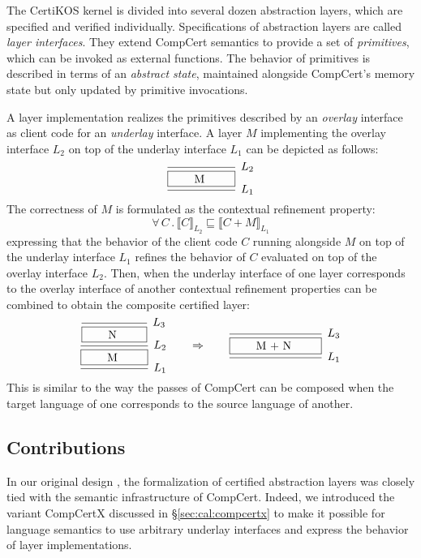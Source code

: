 \documentclass[11pt,oneside]{book}
\theoremstyle{definition}
\newcommand{\refby}{\sqsubseteq} %
\begin{document}
The CertiKOS kernel is divided into several dozen abstraction layers,
which are specified and verified individually.
Specifications of abstraction layers
are called \emph{layer interfaces}.
They extend CompCert semantics
to provide a set of \emph{primitives},
which can be invoked as
external functions.
The behavior of primitives is described in terms of
an \emph{abstract state},
maintained alongside CompCert's memory state
but only updated by primitive invocations.

A layer implementation
realizes the primitives described by an \emph{overlay} interface
as client code for an \emph{underlay} interface.
A layer $M$ implementing the overlay interface $L_2$
on top of the underlay interface $L_1$ can be depicted as follows:
\[
  \begin{prooftree}
    \infer0[$L_2$]{\fbox{\qquad M \qquad}}
    \infer1[$L_1$]{}
  \end{prooftree}
\]
The correctness of $M$ is formulated as
the contextual refinement property:
\[
  \forall \, C \, . \,
  \llbracket C \rrbracket_{L_2} \refby
  \llbracket C + M \rrbracket_{L_1}
\]
expressing that the behavior of the client code $C$
running alongside $M$ on top of the underlay interface $L_1$
refines the behavior of $C$
evaluated on top of the overlay interface $L_2$.
Then,
when the underlay interface of one layer
corresponds to the overlay interface of another
contextual refinement properties can be combined
to obtain the composite certified layer:
\[
  \begin{prooftree}
    \infer0[$L_3$]{\fbox{\qquad N \qquad}}
    \infer1[$L_2$]{\fbox{\qquad M \qquad}}
    \infer1[$L_1$]{}
  \end{prooftree}
  \qquad
  \Rightarrow
  \qquad
  \begin{prooftree}
    \infer0[$L_3$]{\fbox{\qquad M + N \qquad}}
    \infer1[$L_1$]{}
  \end{prooftree}
\]
This is similar to the way the passes of CompCert
can be composed when the target language of one corresponds to
the source language of another.


\subsection{Contributions} %

In our original design \citep{popl15},
the formalization of certified abstraction layers
was closely tied with
the semantic infrastructure of CompCert.
Indeed,
we introduced the variant CompCertX discussed in \S\ref{sec:cal:compcertx}
to make it possible for language semantics
to use arbitrary underlay interfaces and
express the behavior of layer implementations.
\end{document}
